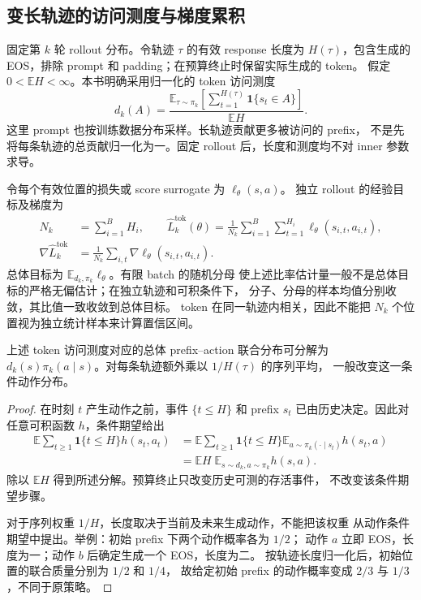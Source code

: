 \subsection{变长轨迹的访问测度与梯度累积}
\label{sec:prefix-measure-reduction}

固定第 $k$ 轮 rollout 分布。令轨迹 $\tau$ 的有效 response 长度为
$H(\tau)$，包含生成的 EOS，排除 prompt 和 padding；在预算终止时保留实际生成的 token。
假定 $0<\mathbb E H<\infty$。本书明确采用归一化的 token 访问测度
\begin{equation}
 d_k(A)=\frac{\mathbb E_{\tau\sim\pi_k}
 [\sum_{t=1}^{H(\tau)}\mathbf1\{s_t\in A\}]}{\mathbb E H}.
\end{equation}
这里 prompt 也按训练数据分布采样。长轨迹贡献更多被访问的 prefix，
不是先将每条轨迹的总贡献归一化为一。固定 rollout 后，长度和测度均不对 inner 参数求导。

令每个有效位置的损失或 score surrogate 为 $\ell_\theta(s,a)$。
独立 rollout 的经验目标及梯度为
\begin{align}
 N_k&=\sum_{i=1}^{B}H_i,\qquad
 \widehat L_k^{\mathrm{tok}}(\theta)
 =\frac1{N_k}\sum_{i=1}^{B}\sum_{t=1}^{H_i}
 \ell_\theta(s_{i,t},a_{i,t}),\\
 \nabla\widehat L_k^{\mathrm{tok}}
 &=\frac1{N_k}\sum_{i,t}\nabla\ell_\theta(s_{i,t},a_{i,t}).
\end{align}
总体目标为 $\mathbb E_{d_k,\pi_k}\ell_\theta$。有限 batch 的随机分母
使上述比率估计量一般不是总体目标的严格无偏估计；在独立轨迹和可积条件下，
分子、分母的样本均值分别收敛，其比值一致收敛到总体目标。
token 在同一轨迹内相关，因此不能把 $N_k$ 个位置视为独立统计样本来计算置信区间。

\begin{proposition}[访问测度与条件动作分布]
上述 token 访问测度对应的总体 prefix--action 联合分布可分解为
$d_k(s)\pi_k(a\mid s)$。对每条轨迹额外乘以 $1/H(\tau)$ 的序列平均，
一般改变这一条件动作分布。
\end{proposition}
\begin{proof}
在时刻 $t$ 产生动作之前，事件 $\{t\le H\}$ 和 prefix $s_t$
已由历史决定。因此对任意可积函数 $h$，条件期望给出
\begin{align}
 \mathbb E\sum_{t\ge1}\mathbf1\{t\le H\}h(s_t,a_t)
 &=\mathbb E\sum_{t\ge1}\mathbf1\{t\le H\}
 \mathbb E_{a\sim\pi_k(\cdot\mid s_t)}h(s_t,a)\\
 &=\mathbb E H\;\mathbb E_{s\sim d_k,a\sim\pi_k}h(s,a).
\end{align}
除以 $\mathbb E H$ 得到所述分解。预算终止只改变历史可测的存活事件，
不改变该条件期望步骤。

对于序列权重 $1/H$，长度取决于当前及未来生成动作，不能把该权重
从动作条件期望中提出。举例：初始 prefix 下两个动作概率各为 $1/2$；
动作 $a$ 立即 EOS，长度为一；动作 $b$ 后确定生成一个 EOS，长度为二。
按轨迹长度归一化后，初始位置的联合质量分别为 $1/2$ 和 $1/4$，
故给定初始 prefix 的动作概率变成 $2/3$ 与 $1/3$，不同于原策略。
\end{proof}


